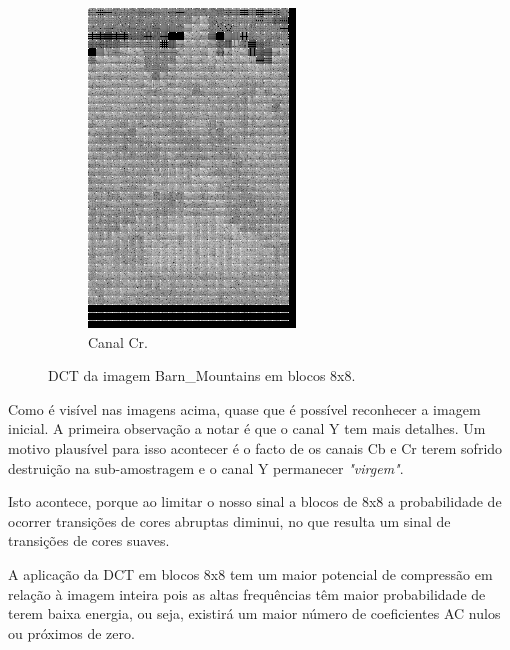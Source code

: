 \documentclass[a4paper, 12pt]{article}
\begin{document}
\begin{figure}[H]
\begin{subfigure}{0.3\textwidth}
                \includegraphics[scale=0.5]{resources/DCT/CRdct8.png}
                \caption{ Canal Cr.}
            \end{subfigure}
            \caption{\label{fig:my_label} DCT da imagem Barn\_Mountains em blocos 8x8.}
        \end{figure}

        Como é visível nas imagens acima, quase que é possível reconhecer a imagem inicial.
        A primeira observação a notar é que o canal Y tem mais detalhes. Um motivo plausível para isso 
        acontecer é o facto de os canais Cb e Cr terem sofrido destruição na sub-amostragem e o canal Y
        permanecer \emph{"virgem"}.

        Isto acontece, porque ao limitar o nosso sinal a blocos de 8x8 a probabilidade de ocorrer transições
        de cores abruptas diminui, no que resulta um sinal de transições de cores suaves.

        A aplicação da DCT em blocos 8x8 tem um maior potencial de compressão em relação à imagem inteira
        pois as altas frequências têm maior probabilidade de terem baixa energia, ou seja, existirá
        um maior número de coeficientes AC nulos ou próximos de zero.\\
\end{document}

